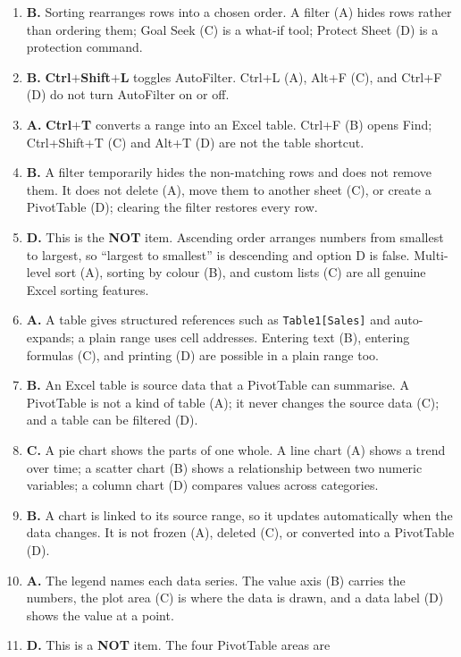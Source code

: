 \begin{enumerate}[label=\textbf{Q\arabic*.}, leftmargin=*]
\item \textbf{B.} Sorting rearranges rows into a chosen order. A filter (A)
  hides rows rather than ordering them; Goal Seek (C) is a what-if tool;
  Protect Sheet (D) is a protection command.
\item \textbf{B.} \textbf{Ctrl}$+$\textbf{Shift}$+$\textbf{L} toggles
  AutoFilter. Ctrl+L (A), Alt+F (C), and Ctrl+F (D) do not turn AutoFilter on
  or off.
\item \textbf{A.} \textbf{Ctrl}$+$\textbf{T} converts a range into an Excel
  table. Ctrl+F (B) opens Find; Ctrl+Shift+T (C) and Alt+T (D) are not the
  table shortcut.
\item \textbf{B.} A filter temporarily hides the non-matching rows and does not
  remove them. It does not delete (A), move them to another sheet (C), or
  create a PivotTable (D); clearing the filter restores every row.
\item \textbf{D.} This is the \textbf{NOT} item. Ascending order arranges
  numbers from smallest to largest, so ``largest to smallest'' is descending and
  option D is false. Multi-level sort (A), sorting by colour (B), and custom
  lists (C) are all genuine Excel sorting features.
\item \textbf{A.} A table gives structured references such as
  \texttt{Table1[Sales]} and auto-expands; a plain range uses cell addresses.
  Entering text (B), entering formulas (C), and printing (D) are possible in a
  plain range too.
\item \textbf{B.} An Excel table is source data that a PivotTable can
  summarise. A PivotTable is not a kind of table (A); it never changes the
  source data (C); and a table can be filtered (D).
\item \textbf{C.} A pie chart shows the parts of one whole. A line chart (A)
  shows a trend over time; a scatter chart (B) shows a relationship between two
  numeric variables; a column chart (D) compares values across categories.
\item \textbf{B.} A chart is linked to its source range, so it updates
  automatically when the data changes. It is not frozen (A), deleted (C), or
  converted into a PivotTable (D).
\item \textbf{A.} The legend names each data series. The value axis (B) carries
  the numbers, the plot area (C) is where the data is drawn, and a data label
  (D) shows the value at a point.
\item \textbf{D.} This is a \textbf{NOT} item. The four PivotTable areas are

\end{enumerate}
